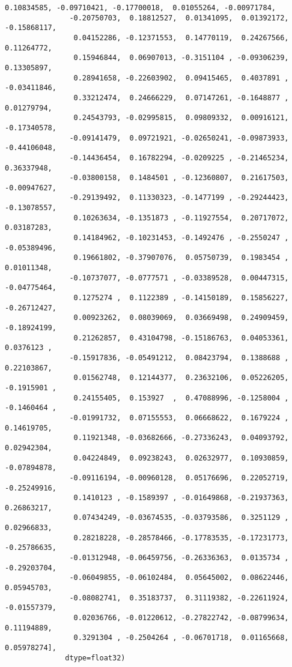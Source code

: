 \documentclass[11pt]{article}
\begin{document}
\begin{Verbatim}[commandchars=\\\{\}]
                0.10834585, -0.09710421, -0.17700018,  0.01055264, -0.00971784,
               -0.20750703,  0.18812527,  0.01341095,  0.01392172, -0.15868117,
                0.04152286, -0.12371553,  0.14770119,  0.24267566,  0.11264772,
                0.15946844,  0.06907013, -0.3151104 , -0.09306239,  0.13305897,
                0.28941658, -0.22603902,  0.09415465,  0.4037891 , -0.03411846,
                0.33212474,  0.24666229,  0.07147261, -0.1648877 ,  0.01279794,
                0.24543793, -0.02995815,  0.09809332,  0.00916121, -0.17340578,
               -0.09141479,  0.09721921, -0.02650241, -0.09873933, -0.44106048,
               -0.14436454,  0.16782294, -0.0209225 , -0.21465234,  0.36337948,
               -0.03800158,  0.1484501 , -0.12360807,  0.21617503, -0.00947627,
               -0.29139492,  0.11330323, -0.1477199 , -0.29244423, -0.13078557,
                0.10263634, -0.1351873 , -0.11927554,  0.20717072,  0.03187283,
                0.14184962, -0.10231453, -0.1492476 , -0.2550247 , -0.05389496,
                0.19661802, -0.37907076,  0.05750739,  0.1983454 ,  0.01011348,
               -0.10737077, -0.0777571 , -0.03389528,  0.00447315, -0.04775464,
                0.1275274 ,  0.1122389 , -0.14150189,  0.15856227, -0.26712427,
                0.00923262,  0.08039069,  0.03669498,  0.24909459, -0.18924199,
                0.21262857,  0.43104798, -0.15186763,  0.04053361,  0.0376123 ,
               -0.15917836, -0.05491212,  0.08423794,  0.1388688 ,  0.22103867,
                0.01562748,  0.12144377,  0.23632106,  0.05226205, -0.1915901 ,
                0.24155405,  0.153927  ,  0.47088996, -0.1258004 , -0.1460464 ,
               -0.01991732,  0.07155553,  0.06668622,  0.1679224 ,  0.14619705,
                0.11921348, -0.03682666, -0.27336243,  0.04093792,  0.02942304,
                0.04224849,  0.09238243,  0.02632977,  0.10930859, -0.07894878,
               -0.09116194, -0.00960128,  0.05176696,  0.22052719, -0.25249916,
                0.1410123 , -0.1589397 , -0.01649868, -0.21937363,  0.26863217,
                0.07434249, -0.03674535, -0.03793586,  0.3251129 ,  0.02966833,
                0.28218228, -0.28578466, -0.17783535, -0.17231773, -0.25786635,
               -0.01312948, -0.06459756, -0.26336363,  0.0135734 , -0.29203704,
               -0.06049855, -0.06102484,  0.05645002,  0.08622446,  0.05945703,
               -0.08082741,  0.35183737,  0.31119382, -0.22611924, -0.01557379,
                0.02036766, -0.01220612, -0.27822742, -0.08799634,  0.11194889,
                0.3291304 , -0.2504264 , -0.06701718,  0.01165668,  0.05978274],
              dtype=float32)
\end{Verbatim}
            
\end{document}

